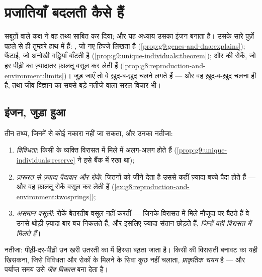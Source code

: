 \chapter{प्रजातियाँ बदलती कैसे हैं}\label{ch:g9:how-species-change}

सबूतों वाले कक्ष ने वह तथ्य साबित कर दिया; और यह अध्याय उसका इंजन बनाता
है। उसके सारे पुर्ज़े पहले से ही तुम्हारे हाथ में हैं: , जो
नए हिज्जे लिखता है (\cref{prop:g9:genes-and-dna:explains}); फेंटाई, जो
अनोखी गड्डियाँ बाँटती है
(\cref{prop:g9:unique-individuals:theorem}); और  की रोकें, जो हर
पीढ़ी का ज़्यादातर फ़ालतू वसूल कर लेती हैं
(\cref{prop:g8:reproduction-and-environment:limits})। जुड़ जाएँ तो वे
ख़ुद-ब-ख़ुद चलने लगते हैं --- और वह ख़ुद-ब-ख़ुद चलना ही
 है, तथा जीव विज्ञान का सबसे बड़े नतीजे वाला सरल
विचार भी।

\section{इंजन, जुड़ा हुआ}

\begin{proposition}[प्राकृतिक चयन]\label{prop:g9:how-species-change:selection}
तीन तथ्य, जिनमें से कोई नकारा नहीं जा सकता, और उनका नतीजा:
\begin{enumerate}
  \item \emph{विविधता}: किसी  के व्यक्ति विरासत में मिले 
        में अलग-अलग होते हैं
        (\cref{prop:g9:unique-individuals:reserve} ने इसे बैंक में रखा
        था);
  \item \emph{ज़रूरत से ज़्यादा पैदावार और रोकें}:  जितनों को
        जीने देता है उससे कहीं ज़्यादा बच्चे पैदा होते हैं --- और वह
        फ़ालतू रोकें वसूल कर लेती हैं
        (\cref{ex:g8:reproduction-and-environment:twosprings});
  \item \emph{असमान वसूली}: रोकें बेतरतीब वसूल नहीं करतीं --- जिनके
        विरासत में मिले  मौजूदा  पर बैठते हैं वे उनसे
        थोड़ी ज़्यादा बार बच निकलते हैं, और इसलिए ज़्यादा संतान छोड़ते
        हैं, \emph{जिन्हें वही  विरासत में मिलते हैं}।
\end{enumerate}
नतीजा: पीढ़ी-दर-पीढ़ी उन खरी उतरती  का  में हिस्सा बढ़ता
जाता है। किसी  की विरासती बनावट का यही खिसकना, जिसे विविधता और रोकों
के मिलने के सिवा कुछ नहीं चलाता, \emph{प्राकृतिक चयन} है --- और पर्याप्त समय उसे \emph{जैव विकास}
बना
देता है।
\end{proposition}
\admitted

